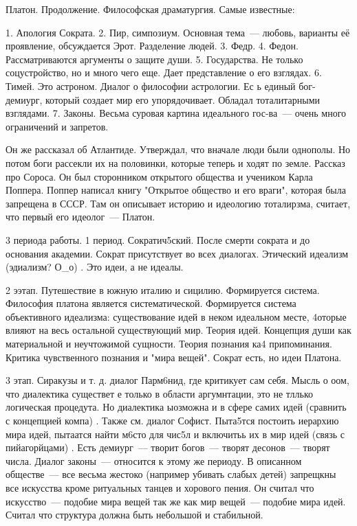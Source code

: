 Платон. Продолжение. 
Философская драматургия. 
Самые известные:

	1. Апология Сократа. 
	2. Пир, симпозиум. Основная тема~--- любовь, варианты её проявление, обсуждается Эрот. Разделение людей. 
	3. Федр. 
	4. Федон. Рассматриваются аргументы о защите души. 
	5. Государства. Не только соцустройство, но и много чего еще. Дает представление о его взглядах. 
	6. Тимей. Это астроном. Диалог о философии астрологии. Ес ь единый бог-демиург, который создает мир его упорядочивает. Обладал тоталитарными взглядами. 
	7. Законы. Весьма суровая картина идеального гос-ва~--- очень много ограничений и запретов. 

Он же рассказал об Атлантиде. 
Утверждал, что вначале люди были однополы. Но потом боги рассекли их на половинки, которые теперь и ходят по земле. 
Рассказ про Сороса. Он был сторонником открытого общества и учеником Карла Поппера. 
Поппер написал книгу "Открытое общество и его враги", которая была запрещена в СССР. 
Там он описывает историю и идеологию тоталирзма, считает, что первый его идеолог~--- Платон. 

3 периода работы. 
1 период. Сократич5ский. После смерти сократа и до основания академии. Сократ присутствует во всех диалогах. Этический идеализм (эдиализм? О_о) . Это идеи, а не идеалы. 

2 ээтап. Путешествие в южную италию и сицилию. Формируется система. Философия платона является систематической. 
Формируется система объективного идеализма: существование идей в неком идеальном месте, 4оторые влияют на весь остальной существующий мир. Теория идей. Концепция души как материальной и неучтожимой сущности. 
Теория познания ка4 припоминания. Критика чувственного познания и "мира вещей". Сократ есть, но идеи Платона. 

3 этап. Сиракузы и т. д. диалог Парм6нид, где критикует сам себя. Мысль о оом, что диалектика существет е только в области аргумнтации, это не тллько логическая процедута. 
Но диалектика ыозможна и в сфере самих идей (сравнить с концепцией компа) . Также см. диалог Софист. Пыта5тся постоить иерархию мира идей, пытаатся найти м6сто для чис5л и включитьь их в мир идей (связь с пийагорйцами) . 
Есть демиург~--- творит богов~--- творят десонов~--- творят числа. Диалог законы~--- относится к этому же периоду. 
В описанном обществе~--- все весьма жестоко (например убивать слабых детей) запрещкны все искусства кроме ритуальных танцев и хорового пения. 
Он считал что искусство~--- подобие мира вещей так же как мир вещей~--- подобие мира идей. Считал что структура должна быть небольшой и стабильной. 

